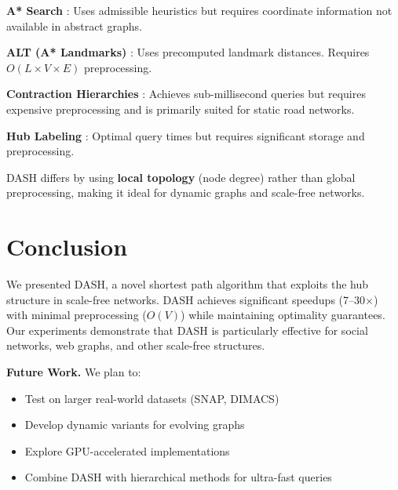 \documentclass[11pt,a4paper]{article}
\begin{document}
\textbf{A* Search} \cite{hart1968}: Uses admissible heuristics but requires 
coordinate information not available in abstract graphs.

\textbf{ALT (A* Landmarks)} \cite{goldberg2005}: Uses precomputed landmark 
distances. Requires $O(L \times V \times E)$ preprocessing.

\textbf{Contraction Hierarchies} \cite{geisberger2008}: Achieves sub-millisecond 
queries but requires expensive preprocessing and is primarily suited for 
static road networks.

\textbf{Hub Labeling} \cite{abraham2011}: Optimal query times but 
requires significant storage and preprocessing.

DASH differs by using \textbf{local topology} (node degree) rather than 
global preprocessing, making it ideal for dynamic graphs and scale-free 
networks.

\section{Conclusion}

We presented DASH, a novel shortest path algorithm that exploits the hub 
structure in scale-free networks. DASH achieves significant speedups 
(7--30$\times$) with minimal preprocessing ($O(V)$) while maintaining 
optimality guarantees. Our experiments demonstrate that DASH is particularly 
effective for social networks, web graphs, and other scale-free structures.

\textbf{Future Work.} We plan to:
\begin{itemize}
    \item Test on larger real-world datasets (SNAP, DIMACS)
    \item Develop dynamic variants for evolving graphs
    \item Explore GPU-accelerated implementations
    \item Combine DASH with hierarchical methods for ultra-fast queries
\end{itemize}
\end{document}
